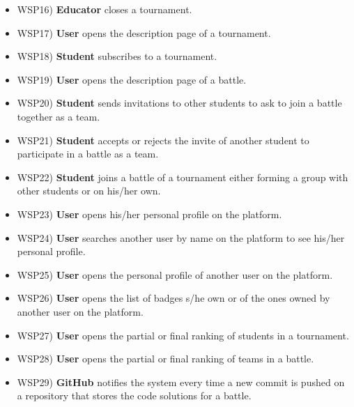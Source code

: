 \begin{itemize}
		\item WSP16) \textbf{Educator} closes a tournament.
		\item WSP17) \textbf{User} opens the description page of a tournament.
		\item WSP18) \textbf{Student} subscribes to a tournament.
		\item WSP19) \textbf{User} opens the description page of a battle.
		\item WSP20) \textbf{Student} sends invitations to other students to ask to join a battle together as a team.
		\item WSP21) \textbf{Student} accepts or rejects the invite of another student to participate in a battle as a team.
		\item WSP22) \textbf{Student} joins a battle of a tournament either forming a group with other students or on his/her own.
		\item WSP23) \textbf{User} opens his/her personal profile on the platform.
		\item WSP24) \textbf{User} searches another user by name on the platform to see his/her personal profile.
		\item WSP25) \textbf{User} opens the personal profile of another user on the platform.
		\item WSP26) \textbf{User} opens the list of badges s/he own or of the ones owned by another user on the platform.
		\item WSP27) \textbf{User} opens the partial or final ranking of students in a tournament.
		\item WSP28) \textbf{User} opens the partial or final ranking of teams in a battle.
		\item WSP29) \textbf{GitHub} notifies the system every time a new commit is pushed on a repository that stores the code solutions for a battle.
	\end{itemize}
	
